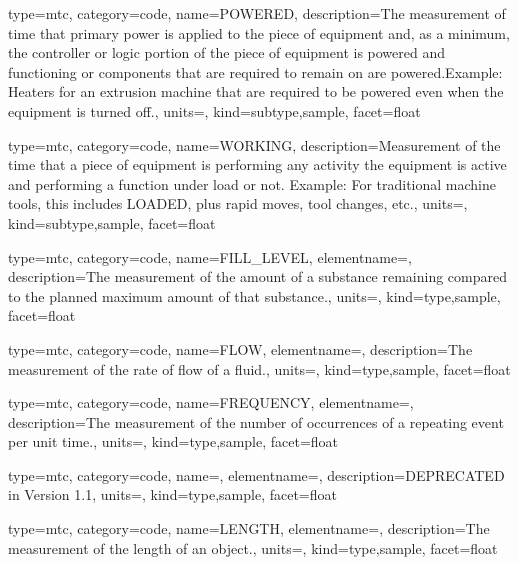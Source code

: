 {
  type=mtc,
  category=code,
  name={POWERED},
  description={The measurement of time that primary power is applied to the piece of equipment and, as a minimum, the controller or logic portion of the piece of equipment is powered and functioning or components that are required to remain on are powered.Example: Heaters for an extrusion machine that are required to be powered even when the equipment is turned off.},
  units=,
  kind={subtype,sample},
  facet={\gls{float}}
}


{
  type=mtc,
  category=code,
  name={WORKING},
  description={Measurement of the time that a piece of equipment is performing any activity  the equipment is active and performing a function under load or not. \newline Example: For traditional machine tools, this includes LOADED, plus rapid moves, tool changes, etc.},
  units=,
  kind={subtype,sample},
  facet={\gls{float}}
}


{
  type=mtc,
  category=code,
  name={FILL\_LEVEL},
  elementname=,
  description={The measurement of the amount of a substance remaining compared to the planned maximum amount of that substance.},
  units=,
  kind={type,sample},
  facet={\gls{float}}
}


{
  type=mtc,
  category=code,
  name={FLOW},
  elementname=,
  description={The measurement of the rate of flow of a fluid.},
  units=,
  kind={type,sample},
  facet={\gls{float}}
}


{
  type=mtc,
  category=code,
  name={FREQUENCY},
  elementname=,
  description={The measurement of the number of occurrences of a repeating event per unit time.},
  units=,
  kind={type,sample},
  facet={\gls{float}}
}


{
  type=mtc,
  category=code,
  name=,
  elementname=,
  description={DEPRECATED in Version 1.1},
  units={},
  kind={type,sample},
  facet={\gls{float}}
}


{
  type=mtc,
  category=code,
  name={LENGTH},
  elementname=,
  description={The measurement of the length of an object.},
  units=,
  kind={type,sample},
  facet={\gls{float}}
}


